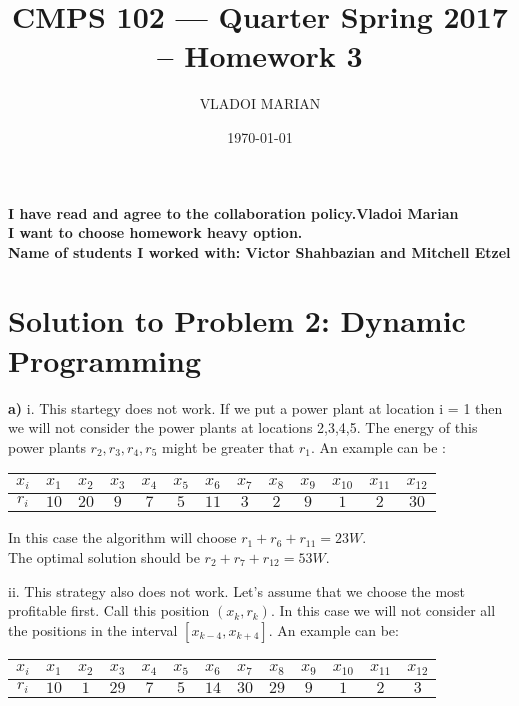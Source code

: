 \documentclass[11 pt]{article}
\title{ CMPS 102 --- Quarter  Spring 2017 --  Homework 3}
\author{VLADOI MARIAN}
\date{\today}
\begin{document}
\maketitle

\begin{center}
{\bf I have read and agree to the collaboration policy.Vladoi Marian}\\
{\bf I want to choose homework heavy option.}\\
{\bf Name of students I worked with: Victor Shahbazian and Mitchell Etzel }
\end{center}


\section*{Solution to Problem 2: Dynamic Programming}
\textbf{a)} i. This startegy does not work. If we put a power plant at location i = 1 then we will not consider the power plants at locations 2,3,4,5. The energy of this power plants $r_2, r_3, r_4, r_5$ might be greater that $r_1$. An example can be :

\begin{center}
\begin{tabular}{|c|c|c|c|c|c|c|c|c|c|c|c|c| } 
 \hline
$x_i$ & $x_1$ & $x_2$ & $x_3$ & $x_4$ & $x_5$ & $x_6$  & $x_7$ & $x_8$ & $x_9$ &  $x_{10}$ & $x_{11}$ & $x_{12} $\\ 
 \hline
$r_i$ &  $10$ & $20$ & $ 9$ & $ 7$ & $  5$ & $ 11$ & $ 3$ & $2$ & $ 9$  & $ 1$ & $ 2$ & $ 30$ \\ 
 
 \hline
 
\end{tabular}
\end{center}
 
 In this case the algorithm will choose $r_1 + r_6 + r_{11} = 23 W$.\\
 The optimal solution should be $r_2 + r_7 + r_{12} = 53 W$.
 
 ii. This strategy also does not work. Let's assume that we choose the most profitable first. Call this position $(x_k , r_k)$. In this case we will not consider all the positions in the interval $[x_{k-4} , x_ {k+4}]$. An example can be: 
 \begin{center}
\begin{tabular}{|c|c|c|c|c|c|c|c|c|c|c|c|c| } 
 \hline
$x_i$ & $x_1$ & $x_2$ & $x_3$ & $x_4$ & $x_5$ & $x_6$  & $x_7$ & $x_8$ & $x_9$ &  $x_{10}$ & $x_{11}$ & $x_{12} $\\ 
 \hline
$r_i$ &  $10$ & $1$ & $ 29$ & $ 7$ & $  5$ & $ 14$ & $ 30$ & $29$ & $ 9$  & $ 1$ & $ 2$ & $ 3$ \\ 
 
 \hline
 
\end{tabular}
\end{center}
  
\end{document}
